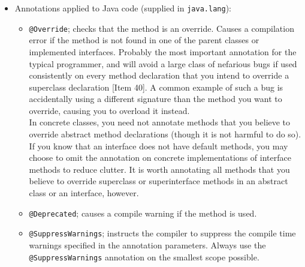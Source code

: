 \documentclass[8pt, table, xcdraw]{article}%
\begin{document}
\begin{itemize}
    \item Annotations applied to Java code (supplied in \lstinline{java.lang}):
    \begin{itemize}
        \item \lstinline{@Override}; checks that the method is an override. Causes a compilation error if the method is not found in one of the parent classes or implemented interfaces. Probably the most important annotation for the typical programmer, and will avoid a large class of nefarious bugs if used consistently on every method declaration that you intend to override a superclass declaration [Item 40]. A common example of such a bug is accidentally using a different signature than the method you want to override, causing you to overload it instead.\\
        In concrete classes, you need not annotate methods that you believe to override abstract method declarations (though it is not harmful to do so). If you know that an interface does not have default methods, you may choose to omit the annotation on concrete implementations of interface methods to reduce clutter. It is worth annotating all methods that you believe to override superclass or superinterface methods in an abstract class or an interface, however.
        \item \lstinline{@Deprecated}; causes a compile warning if the method is used.
        \item \lstinline{@SuppressWarnings}; instructs the compiler to suppress the compile time warnings specified in the annotation parameters. Always use the \lstinline{@SuppressWarnings} annotation on the smallest scope possible.
    \end{itemize}


\end{itemize}
\end{document}
